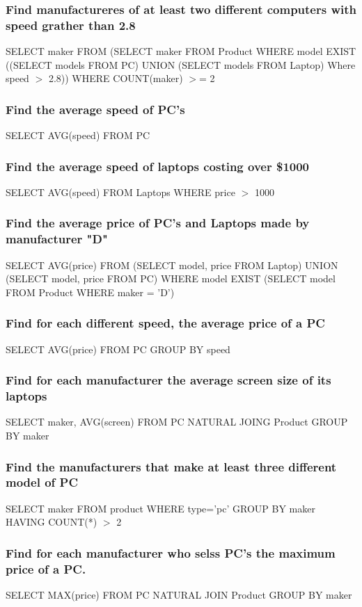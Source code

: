 \documentclass[12pt, a4paper]{article}
\begin{document}
			\subsubsection{Find manufactureres of at least two different computers with speed grather than 2.8}
				SELECT maker FROM (SELECT maker FROM Product WHERE model EXIST\\
				((SELECT models FROM PC) UNION (SELECT models FROM  Laptop) Where speed $>$ 2.8)) WHERE COUNT(maker) $>$= 2		
			\subsubsection{Find the average speed of PC's}
				SELECT AVG(speed) FROM PC
			\subsubsection{Find the average speed of laptops costing over \$1000}
				SELECT AVG(speed) FROM Laptops WHERE price $>$ 1000
			\subsubsection{Find the average price of PC's and Laptops made by manufacturer "D"}
				SELECT AVG(price) FROM (SELECT model, price FROM Laptop) UNION (SELECT model, price FROM PC) WHERE model EXIST (SELECT model FROM Product WHERE maker = 'D')
			\subsubsection{Find for each different speed, the average price of a PC}
				SELECT AVG(price) FROM PC GROUP BY speed
			\subsubsection{Find for each manufacturer the average screen size of its laptops}
				SELECT maker, AVG(screen) FROM PC NATURAL JOING Product GROUP BY maker
			\subsubsection{Find the manufacturers that make at least three different model of PC}
				SELECT maker FROM product WHERE type='pc' GROUP BY maker HAVING COUNT(*) $>$ 2
			\subsubsection{Find for each manufacturer who selss PC's the maximum price of a PC.}
				SELECT MAX(price) FROM PC NATURAL JOIN Product GROUP BY maker
\end{document}
